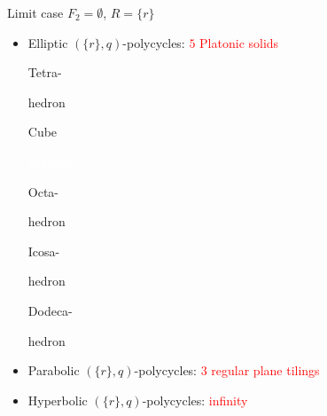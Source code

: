 \documentclass[%
pdf,
colorBG,
slideColor,
]{prosper}
\begin{document}
\begin{slide}{Limit case $F_2=\emptyset$, $R=\{r\}$}
\vspace{-3mm}
\begin{itemize}
\item Elliptic $(\{r\}, q)$-polycycles: \textcolor{red}{$5$ Platonic solids}
\begin{center}
\begin{minipage}[b]{2.0cm}
\centering
{}\par
Tetra-\par
hedron
\end{minipage}
\begin{minipage}[b]{2.0cm}
\centering
{}\par
Cube\par
\textcolor{white}{Bonjour}
\end{minipage}
\begin{minipage}[b]{2.0cm}
\centering
{}\par
Octa-\par
hedron
\end{minipage}
\begin{minipage}[b]{2.0cm}
\centering
{}\par
Icosa-\par
hedron
\end{minipage}
\begin{minipage}[b]{2.0cm}
\centering
{}\par
Dodeca-\par
hedron
\end{minipage}
\end{center}
\item Parabolic $(\{r\}, q)$-polycycles: \textcolor{red}{$3$ regular plane tilings}
\begin{center}
\begin{minipage}[b]{3.0cm}
\centering
{}\par
\end{minipage}
\begin{minipage}[b]{3.0cm}
\centering
{}\par
\end{minipage}
\begin{minipage}[b]{3.0cm}
\centering
{}\par
\end{minipage}
\end{center}
\item Hyperbolic $(\{r\}, q)$-polycycles: \textcolor{red}{infinity}
\end{itemize}
\end{slide}
\end{document}
